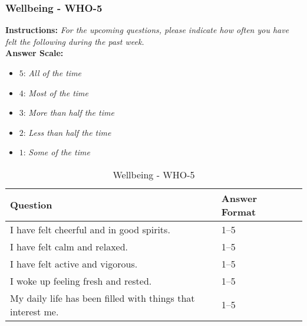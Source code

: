 \subsubsection{Wellbeing - WHO-5}
\textbf{Instructions:} \emph{For the upcoming questions, please indicate how often you have felt the following during the past week.}
\\
\textbf{Answer Scale:}
\begin{itemize}
    \item $5$: \emph{All of the time}
    \item $4$: \emph{Most of the time}
    \item $3$: \emph{More than half the time}
    \item $2$: \emph{Less than half the time}
    \item $1$: \emph{Some of the time}
\end{itemize}
\begin{table}[H]
    \centering
    \renewcommand{\arraystretch}{1.2}
    \begin{tabularx}{\textwidth}{|l|X|l|}
        \hline
        \textbf{Question} & \textbf{Answer Format} \\ \hline
        I have felt cheerful and in good spirits. & 1--5 \\ \hline
        I have felt calm and relaxed. & 1--5 \\ \hline
        I have felt active and vigorous. & 1--5 \\ \hline
        I woke up feeling fresh and rested. & 1--5 \\ \hline
        My daily life has been filled with things that interest me. & 1--5 \\ \hline
    \end{tabularx}
    \caption{Wellbeing - WHO-5}
    \label{tab:who-5}
\end{table}


\newpage
